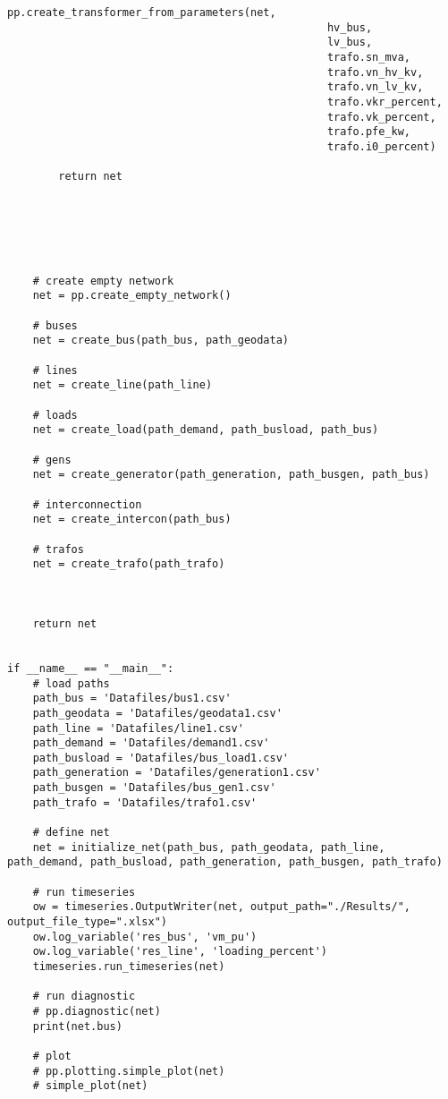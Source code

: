 \begin{lstlisting}[caption={Main code in Python with the Pandapower library}]
            pp.create_transformer_from_parameters(net,
                                                  hv_bus,
                                                  lv_bus,
                                                  trafo.sn_mva,
                                                  trafo.vn_hv_kv,
                                                  trafo.vn_lv_kv,
                                                  trafo.vkr_percent,
                                                  trafo.vk_percent,
                                                  trafo.pfe_kw,
                                                  trafo.i0_percent)

        return net






    # create empty network
    net = pp.create_empty_network()

    # buses
    net = create_bus(path_bus, path_geodata)

    # lines
    net = create_line(path_line)

    # loads
    net = create_load(path_demand, path_busload, path_bus)

    # gens
    net = create_generator(path_generation, path_busgen, path_bus)

    # interconnection
    net = create_intercon(path_bus)

    # trafos
    net = create_trafo(path_trafo)



    return net


if __name__ == "__main__":
    # load paths
    path_bus = 'Datafiles/bus1.csv'
    path_geodata = 'Datafiles/geodata1.csv'
    path_line = 'Datafiles/line1.csv'
    path_demand = 'Datafiles/demand1.csv'
    path_busload = 'Datafiles/bus_load1.csv'
    path_generation = 'Datafiles/generation1.csv'
    path_busgen = 'Datafiles/bus_gen1.csv'
    path_trafo = 'Datafiles/trafo1.csv'

    # define net
    net = initialize_net(path_bus, path_geodata, path_line, path_demand, path_busload, path_generation, path_busgen, path_trafo)

    # run timeseries
    ow = timeseries.OutputWriter(net, output_path="./Results/", output_file_type=".xlsx")
    ow.log_variable('res_bus', 'vm_pu')
    ow.log_variable('res_line', 'loading_percent')
    timeseries.run_timeseries(net)

    # run diagnostic
    # pp.diagnostic(net)
    print(net.bus)

    # plot
    # pp.plotting.simple_plot(net)
    # simple_plot(net)
\end{lstlisting}
